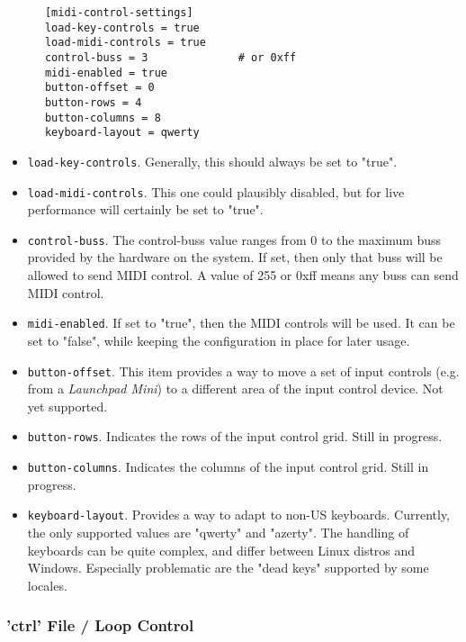 	\begin{verbatim}
      [midi-control-settings]
      load-key-controls = true
      load-midi-controls = true
      control-buss = 3              # or 0xff
      midi-enabled = true
      button-offset = 0
      button-rows = 4
      button-columns = 8
      keyboard-layout = qwerty
	\end{verbatim}

   \begin{itemize}
      \item \texttt{load-key-controls}.
         Generally, this should always be set to "true".
      \item \texttt{load-midi-controls}.
         This one could plausibly disabled, but for live performance will
         certainly be set to "true".
      \item \texttt{control-buss}.
         The control-buss value ranges from 0 to the maximum buss provided by
         the hardware on the system. If set, then only that buss will be allowed
         to send MIDI control.  A value of 255 or 0xff means any buss can send
         MIDI control.
      \item \texttt{midi-enabled}.
         If set to "true", then the MIDI controls will be used.
         It can be set to "false", while keeping the configuration in place
         for later usage.
      \item \texttt{button-offset}.
         This item provides a way to move a set of input controls (e.g. from a
         \textsl{Launchpad Mini}) to a different area of the input control
         device.  Not yet supported.
      \item \texttt{button-rows}.
         Indicates the rows of the input control grid.
         Still in progress.
      \item \texttt{button-columns}.
         Indicates the columns of the input control grid.
         Still in progress.
      \item \texttt{keyboard-layout}.
         Provides a way to adapt to non-US keyboards.
         Currently, the only supported values are "qwerty" and "azerty".
         The handling of keyboards can be quite complex, and differ between
         Linux distros and Windows.
         Especially problematic are the "dead keys" supported by some locales.
   \end{itemize}

\subsubsection{'ctrl' File / Loop Control}
\label{subsubsec:configuration_ctrl_loop_control}

